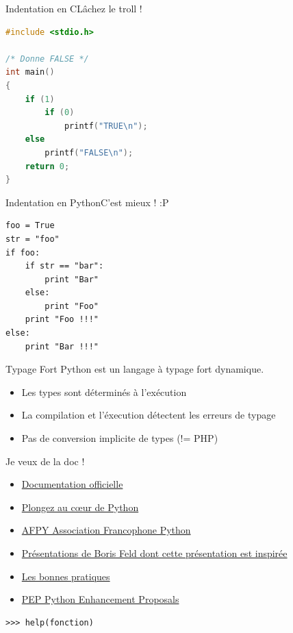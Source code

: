 \documentclass{beamer}
\begin{document}
\begin{frame}[fragile]{Indentation en C}{Lâchez le troll !}
\begin{lstlisting}[language=C]
#include <stdio.h>

/* Donne FALSE */
int main()
{
    if (1)
        if (0)
            printf("TRUE\n");
    else
        printf("FALSE\n");
    return 0;
}
\end{lstlisting}

\end{frame}

\begin{frame}[fragile]{Indentation en Python}{C'est mieux ! :P}
 
\begin{lstlisting}
foo = True
str = "foo"
if foo:
    if str == "bar":
        print "Bar"
    else:
        print "Foo"
    print "Foo !!!"
else:
    print "Bar !!!"
\end{lstlisting}

\end{frame}

\begin{frame}{Typage Fort}
Python est un langage à typage fort dynamique.

\begin{itemize}
 \item Les types sont déterminés à l'exécution
 \item La compilation et l'éxecution détectent les erreurs de typage
 \item Pas de conversion implicite de types (!= PHP)
\end{itemize}

\end{frame}



\begin{frame}[fragile]{Je veux de la doc !}
\begin{itemize}
 \item \href{http://docs.python.org/}{Documentation officielle}
 \item \href{http://diveintopython.adrahon.org/}{Plongez au c\oe{}ur de Python}
 \item \href{http://www.afpy.org/}{AFPY Association Francophone Python}
 \item \href{http://feldboris.alwaysdata.net/blog/pages/presentations/}{Présentations de Boris Feld dont cette présentation est inspirée}
 \item \href{http://www.biologeek.com/bonnes-pratiques,conferences,django,python,traduction/bonnes-pratiques-et-astuces-python/}{Les bonnes pratiques}
 \item \href{http://www.python.org/dev/peps/}{PEP Python Enhancement Proposals}
\end{itemize}

\begin{lstlisting}
>>> help(fonction)
\end{lstlisting}


\end{frame}
\end{document}
